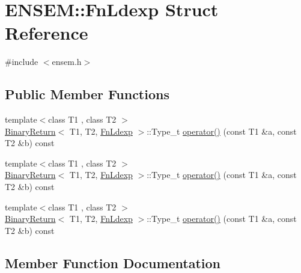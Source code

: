 \hypertarget{structENSEM_1_1FnLdexp}{}\section{E\+N\+S\+EM\+:\+:Fn\+Ldexp Struct Reference}
\label{structENSEM_1_1FnLdexp}


{\ttfamily \#include $<$ensem.\+h$>$}

\subsection*{Public Member Functions}
\begin{DoxyCompactItemize}
\item 
{\footnotesize template$<$class T1 , class T2 $>$ }\\\mbox{\hyperlink{structENSEM_1_1BinaryReturn}{Binary\+Return}}$<$ T1, T2, \mbox{\hyperlink{structENSEM_1_1FnLdexp}{Fn\+Ldexp}} $>$\+::Type\+\_\+t \mbox{\hyperlink{structENSEM_1_1FnLdexp_a018e96259f66cd8923edf0610629b52c}{operator()}} (const T1 \&a, const T2 \&b) const
\item 
{\footnotesize template$<$class T1 , class T2 $>$ }\\\mbox{\hyperlink{structENSEM_1_1BinaryReturn}{Binary\+Return}}$<$ T1, T2, \mbox{\hyperlink{structENSEM_1_1FnLdexp}{Fn\+Ldexp}} $>$\+::Type\+\_\+t \mbox{\hyperlink{structENSEM_1_1FnLdexp_a018e96259f66cd8923edf0610629b52c}{operator()}} (const T1 \&a, const T2 \&b) const
\item 
{\footnotesize template$<$class T1 , class T2 $>$ }\\\mbox{\hyperlink{structENSEM_1_1BinaryReturn}{Binary\+Return}}$<$ T1, T2, \mbox{\hyperlink{structENSEM_1_1FnLdexp}{Fn\+Ldexp}} $>$\+::Type\+\_\+t \mbox{\hyperlink{structENSEM_1_1FnLdexp_a018e96259f66cd8923edf0610629b52c}{operator()}} (const T1 \&a, const T2 \&b) const
\end{DoxyCompactItemize}


\subsection{Member Function Documentation}
\mbox{\label{structENSEM_1_1FnLdexp_a018e96259f66cd8923edf0610629b52c}} 
